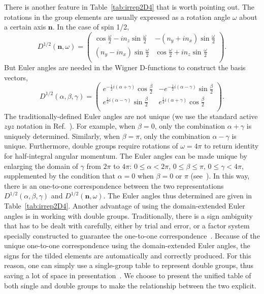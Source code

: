 \documentclass[aps,prd,reprint,showpacs,floatfix,longbibliography,,superscriptaddress]{revtex4-1}
\def\beq{\begin{equation}}
\def\eeq{\end{equation}}
\begin{document}
\begin{widetext}
There is another feature in Table~\ref{tab:irrep2D4} that is worth pointing out. 
The rotations in the group elements are usually expressed as a rotation angle $\omega$ 
about a certain axis $\bm n$.  In the case of spin 1/2,
%
\beq
D^{1/2}(\bm n,\omega)  =
\left(
\begin{array}{cc}
 \cos\frac{\omega }{2}-i n_z \sin \frac{\omega }{2}  &-(n_y+i  n_x)  \sin \frac{\omega }{2} \\
 (n_y-i n_x) \sin \frac{\omega }{2}  & \cos \frac{\omega }{2}+i  n_z \sin \frac{\omega }{2} \\
\end{array}
\right).
\label{eq:euler1}
\eeq
%
But Euler angles are needed in the Wigner D-functions to construct the basis vectors, 
%
\beq
D^{1/2}(\alpha,\beta,\gamma)  =
\left(
\begin{array}{cc}
 e^{-\frac{1}{2} i (\alpha +\gamma )} \cos \frac{\beta }{2} & -e^{-\frac{1}{2} i (\alpha -\gamma )} \sin
   \frac{\beta }{2}\\
 e^{\frac{1}{2} i (\alpha -\gamma )} \sin\frac{\beta }{2} & e^{\frac{1}{2} i (\alpha +\gamma )} \cos
\frac{\beta }{2} \\
\end{array}
\right).
\label{eq:euler2}
\eeq
%
The traditionally-defined Euler angles are not unique 
(we use the standard active $zyz$ notation in Ref.~\cite{Tinkham:1992}). 
For example, when $\beta=0$, only the combination $\alpha+\gamma$ is  uniquely determined.
Similarly, when $\beta=\pi$, only the combination $\alpha-\gamma$ is unique.
Furthermore,  double groups require rotations of $\omega=4\pi$ to return identity for half-integral angular momentum.
The  Euler angles can be made unique by enlarging the domain of $\gamma$ from $2\pi$ to $4\pi$:
$0\le \alpha < 2\pi$,  $0\le \beta \le \pi$,  $0\le\gamma< 4\pi$, supplemented by the condition that 
$\alpha=0$ when $\beta=0$ or $\pi$ (see~\cite{Chen:2002}). 
In this way, there is an one-to-one correspondence between the two 
representations $D^{1/2}(\alpha,\beta,\gamma)$ and $D^{1/2}(\bm n,\omega)$. 
The Euler angles thus determined are given in Table~\ref{tab:irrep2D4}.
Another advantage of using the domain-extended Euler angles is in working with double groups. 
Traditionally, there is a sign ambiguity that has to be dealt with carefully, 
either by trial and error, or a factor system specially constructed to guarantee the 
one-to-one correspondence~\cite{Altmann:1994}.
Because of the unique one-to-one correspondence using the domain-extended Euler angles, 
the signs for the tilded elements are automatically and correctly produced.
For this reason, one can simply use a single-group table to represent double groups, 
thus saving a lot of space in presentation~\cite{Chen:2002}.
We choose to present the unified table of both single and double groups to make the relationship 
between the two explicit.


\end{widetext}
\end{document}
